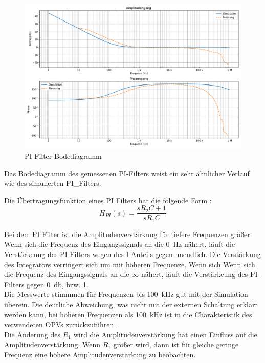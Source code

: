 \begin{figure}[H]
  \centering  \includegraphics[width=0.8\linewidth]{Elektronik-Laborprotokoll_Filter/Plots/PI_Filter_Bodediagramm_Simulation_mit_Messung.pdf}
  \caption{PI Filter Bodediagramm}
  \label{fig:PI_Filter_Bodediagramm}
\end{figure}
%
Das Bodediagramm des gemessenen PI-Filters weist ein sehr ähnlicher Verlauf wie des simulierten PI\_Filters.

Die Übertragungsfunktion eines PI Filters hat die folgende Form \cite{Skript}:
\begin{equation}
  H_{PI}(s) = \frac{sR_2C + 1}{sR_1C}
\end{equation}




Bei dem PI Filter ist die Amplitudenverstärkung für tiefere Frequenzen größer. Wenn sich die Frequenz des Eingangssignals an die \SI{0}{\hertz} nähert, läuft die Verstärkeung des PI-Filters wegen des I-Anteils gegen unendlich. Die Verstärkung des Integrators verringert sich um mit höheren Frequenze. Wenn sich Wenn sich die Frequenz des Eingangssignals an die $\infty$ nähert, läuft die Verstärkeung des PI-Filters gegen \SI{0}{\decibel}, bzw. 1.\\
Die Messwerte stimmmen für Frequenzen bis \SI{100}{\kilo\hertz} gut mit der Simulation überein. Die deutliche Abweichung, was nicht mit der externen Schaltung erklärt werden kann, bei höheren Frequenzen als \SI{100}{\kilo\hertz} ist in die Charakteristik des verwendeten OPVs zurückzuführen.\\

Die Änderung des $R_1$ wird die Amplitudenverstärkung hat einen Einfluss auf die Amplitudenverstärkung. Wenn $R_1$ größer wird, dann ist für gleiche geringe Frequenz eine höhere Amplitudenverstärkung zu beobachten.\\

